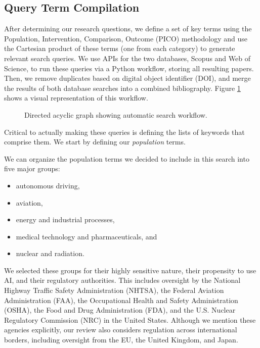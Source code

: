 \documentclass[preprint,12pt]{elsarticle}
\begin{document}
\subsection{Query Term Compilation}
After determining our research questions, we define a set of key terms using the
Population, Intervention, Comparison, Outcome (PICO) methodology
\cite{schardtUtilizationPICOFramework2007} and use the Cartesian product of
these terms (one from each category) to generate relevant search queries. We use
APIs for the two databases, Scopus and Web of Science, to run these queries via
a Python workflow, storing all resulting papers. Then, we remove duplicates
based on digital object identifier (DOI), and merge the results of both database
searches into a combined bibliography. Figure \ref{fig:workflow} shows a visual
representation of this workflow. 

\begin{figure}
    \centering
    \resizebox{0.8\textwidth}{!}{}
    \caption{Directed acyclic graph showing automatic search workflow.}
    \label{fig:workflow}
\end{figure}

Critical to actually making these queries is defining the lists of keywords that
comprise them. We start by defining our \textit{population} terms.  

We can organize the population terms we decided to include in this search into
five major groups: 
\begin{itemize}
    \item autonomous driving,
    \item aviation,
    \item energy and industrial processes,
    \item medical technology and pharmaceuticals, and
    \item nuclear and radiation.
\end{itemize}

We selected these groups for their highly sensitive nature, their propensity to
use AI, and their regulatory authorities. This includes oversight by the
National Highway Traffic Safety Administration (NHTSA), the Federal Aviation
Administration (FAA), the Occupational Health and Safety Administration (OSHA),
the Food and Drug Administration (FDA), and the U.S. Nuclear Regulatory
Commission (NRC) in the United States. Although we mention these agencies
explicitly, our review also considers regulation across international borders,
including oversight from the EU, the United Kingdom, and Japan. 
\end{document}
